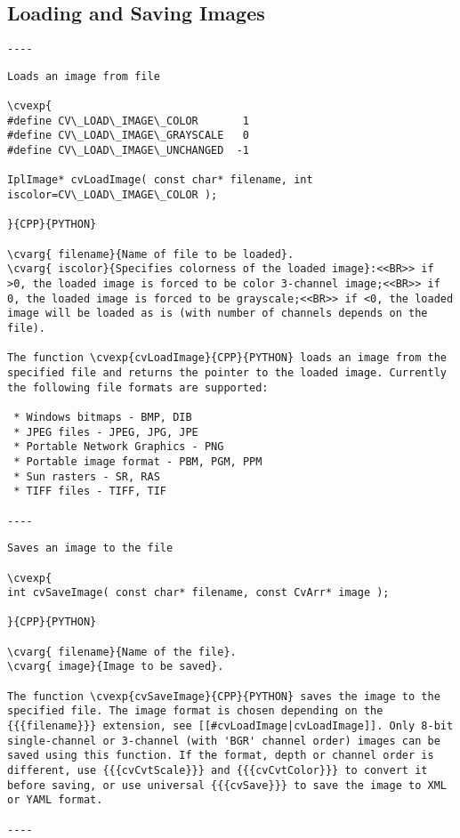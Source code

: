 \subsection{Loading and Saving Images}
\begin{verbatim}
----
\end{verbatim}
\begin{verbatim}
Loads an image from file

\cvexp{
#define CV\_LOAD\_IMAGE\_COLOR       1
#define CV\_LOAD\_IMAGE\_GRAYSCALE   0
#define CV\_LOAD\_IMAGE\_UNCHANGED  -1

IplImage* cvLoadImage( const char* filename, int iscolor=CV\_LOAD\_IMAGE\_COLOR );

}{CPP}{PYTHON}

\cvarg{ filename}{Name of file to be loaded}.
\cvarg{ iscolor}{Specifies colorness of the loaded image}:<<BR>> if >0, the loaded image is forced to be color 3-channel image;<<BR>> if 0, the loaded image is forced to be grayscale;<<BR>> if <0, the loaded image will be loaded as is (with number of channels depends on the file).

The function \cvexp{cvLoadImage}{CPP}{PYTHON} loads an image from the specified file and returns the pointer to the loaded image. Currently the following file formats are supported:

 * Windows bitmaps - BMP, DIB
 * JPEG files - JPEG, JPG, JPE
 * Portable Network Graphics - PNG
 * Portable image format - PBM, PGM, PPM
 * Sun rasters - SR, RAS
 * TIFF files - TIFF, TIF

----
\end{verbatim}
\begin{verbatim}
Saves an image to the file

\cvexp{
int cvSaveImage( const char* filename, const CvArr* image );

}{CPP}{PYTHON}

\cvarg{ filename}{Name of the file}.
\cvarg{ image}{Image to be saved}.

The function \cvexp{cvSaveImage}{CPP}{PYTHON} saves the image to the specified file. The image format is chosen depending on the {{{filename}}} extension, see [[#cvLoadImage|cvLoadImage]]. Only 8-bit single-channel or 3-channel (with 'BGR' channel order) images can be saved using this function. If the format, depth or channel order is different, use {{{cvCvtScale}}} and {{{cvCvtColor}}} to convert it before saving, or use universal {{{cvSave}}} to save the image to XML or YAML format.

----
\end{verbatim}
